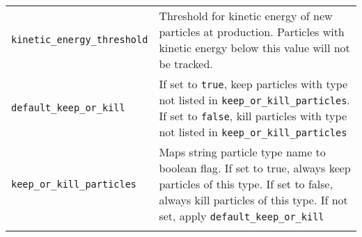 \begin{table*}
\begin{center}
\begin{tabularx}{\textwidth}{lX}
\verb|kinetic_energy_threshold| & Threshold for kinetic energy of new particles at production. Particles with kinetic energy below this value will not be tracked.\\
\verb|default_keep_or_kill| & If set to \verb|true|, keep particles with type not listed in \verb|keep_or_kill_particles|. If set to \verb|false|, kill particles with type not listed in \verb|keep_or_kill_particles|\\
\verb|keep_or_kill_particles| & Maps string particle type name to boolean flag. If set to true, always keep particles of this type. If set to false, always kill particles of this type. If not set, apply \verb|default_keep_or_kill|\\
\begin{makeimage} %
\end{makeimage} 
\end{tabularx}
\end{center}
\end{table*}

